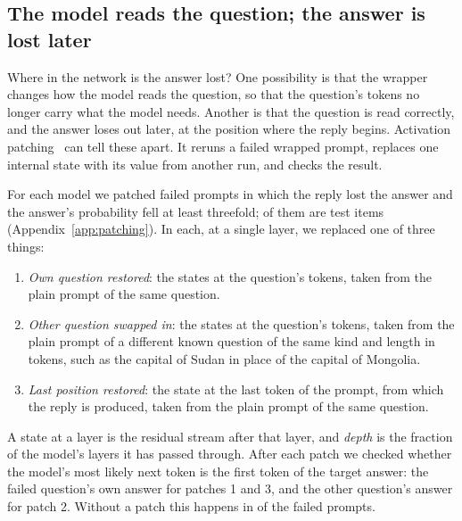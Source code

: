 \subsection{The model reads the question; the answer is lost later}
\label{sec:where}

Where in the network is the answer lost? One possibility is that the wrapper changes how the model reads the question, so that the question's tokens no longer carry what the model needs. Another is that the question is read correctly, and the answer loses out later, at the position where the reply begins. Activation patching~\citep{vig2020causal,meng2022locating} can tell these apart. It reruns a failed wrapped prompt, replaces one internal state with its value from another run, and checks the result.

For each model we patched failed prompts in which the reply lost the answer and the answer's probability fell at least threefold; \NPairsTest{} of them are test items (Appendix~\ref{app:patching}). In each, at a single layer, we replaced one of three things:
\begin{enumerate}
\item \emph{Own question restored}: the states at the question's tokens, taken from the plain prompt of the same question.
\item \emph{Other question swapped in}: the states at the question's tokens, taken from the plain prompt of a different known question of the same kind and length in tokens, such as the capital of Sudan in place of the capital of Mongolia.
\item \emph{Last position restored}: the state at the last token of the prompt, from which the reply is produced, taken from the plain prompt of the same question.
\end{enumerate}
A state at a layer is the residual stream after that layer, and \emph{depth} is the fraction of the model's layers it has passed through. After each patch we checked whether the model's most likely next token is the first token of the target answer: the failed question's own answer for patches 1 and 3, and the other question's answer for patch 2. Without a patch this happens in \NoPatch{} of the failed prompts.

